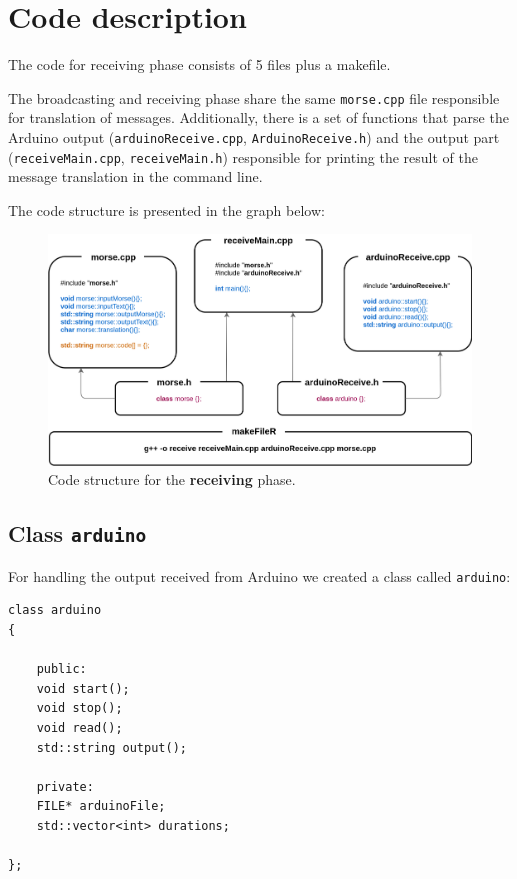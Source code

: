 \documentclass[10pt]{report}
\begin{document}
\section{Code description}

The code for receiving phase consists of 5 files plus a makefile. 

The broadcasting and receiving phase share the same \verb|morse.cpp| file responsible for translation of messages. Additionally, there is a set of functions that parse the Arduino output (\verb|arduinoReceive.cpp|, \verb|ArduinoReceive.h|) and the output part (\verb|receiveMain.cpp|, \verb|receiveMain.h|) responsible for printing the result of the message translation in the command line.

The code structure is presented in the graph below:

\begin{figure}[H]
\centering\includegraphics[width=14.5cm]{rCodeStructure}
\caption{Code structure for the \textbf{receiving} phase.}	
\label{fig:re_code}
\end{figure}

\newpage

\subsection{Class \texttt{arduino}}

For handling the output received from Arduino we created a class called \verb|arduino|:

\begin{lstlisting}
class arduino
{

	public:
	void start();
	void stop();
	void read();
	std::string output();

	private:
	FILE* arduinoFile;
	std::vector<int> durations;
	
};
\end{lstlisting}
\end{document}
